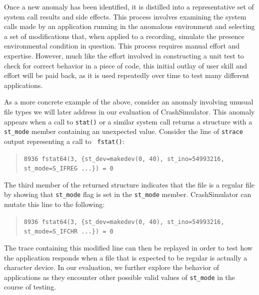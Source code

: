 Once a new anomaly has been identified, it is distilled into a
representative set of system call results and side effects.
This process involves examining the
system calls made by an application running in the anomalous environment
and selecting a set of modifications that, when applied to a recording,
simulate the presence environmental condition in question.
This process requires manual effort and expertise.  However,
much like
the effort involved in constructing a unit test to check for correct
behavior in a piece of code, this initial outlay of
user skill and effort will be paid back, as it is
used repeatedly over time to test many different applications.

As a more concrete example of the above, consider an anomaly
involving unusual file types we will later address in our evaluation of
CrashSimulator.
This anomaly appears when a call to {\tt stat()} or a similar system
call returns a structure with a {\tt st\_mode}
member containing an unexpected
value. Consider the line of {\tt strace} output representing a call to {\tt
  fstat()}:
\begin{quote}
  {\tt 8936  fstat64(3, \{st\_dev=makedev(0, 40), st\_ino=54993216, st\_mode=S\_IFREG ...\}) = 0}
\end{quote}
The third member of the returned structure indicates that the file is a
regular file by showing that {\tt st\_mode} flag is set in the {\tt st\_mode}
member.  CrashSimulator can mutate this  line to the following:

\begin{quote}
  {\tt 8936  fstat64(3, \{st\_dev=makedev(0, 40), st\_ino=54993216, st\_mode=S\_IFCHR ...\}) = 0}
\end{quote}

The trace containing this modified line can then be replayed in order to
test how the application responds when a file that is expected to be
regular is actually a character device. In our evaluation, we further
explore the behavior of applications as they encounter other possible valid
values of {\tt st\_mode} in the course of testing.
